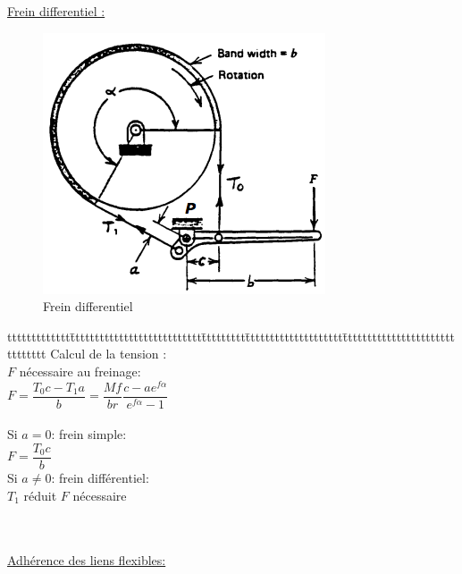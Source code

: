 \underline{Frein differentiel :}\\
\begin{minipage}[c]{.4\linewidth}
\begin{figure}[H]
\centering
\includegraphics[width=0.8\linewidth]{frein.png}
\caption{Frein differentiel}
\label{frein}
\end{figure}
\end{minipage}
\hfill
\begin{minipage}[c]{.5\linewidth}
\begin{bluebox}
\begin{tabbing}
ttttttttttttt\=ttttttttttttttttttttttttttt\=ttttttttt\=tttttttttttttttttttt\=ttttttttttttttttttttttttttttttt\kill
Calcul de la tension :\\
$F$ nécessaire au freinage:\\
\>$F = \dfrac{T_0c-T_1a}{b} = \dfrac{Mf}{br}\dfrac{c-ae^{f\alpha}}{e^{f\alpha}-1}$\\\\
Si $a=0$: frein simple:\\
\>$F=\dfrac{T_0c}{b}$\\
Si $a\neq0$: frein différentiel:\\
\>$T_1$ réduit $F$ nécessaire
\end{tabbing}
\end{bluebox}
\end{minipage}\\\\

\underline{Adhérence des liens flexibles:}\\

